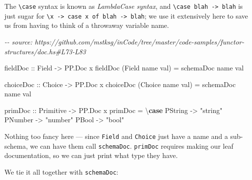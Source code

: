 \documentclass[]{article}
\newenvironment{Shaded}{}{}
\newcommand{\CommentTok}[1]{\textcolor[rgb]{0.38,0.63,0.69}{\textit{#1}}}
\newcommand{\DataTypeTok}[1]{\textcolor[rgb]{0.56,0.13,0.00}{#1}}
\newcommand{\KeywordTok}[1]{\textcolor[rgb]{0.00,0.44,0.13}{\textbf{#1}}}
\newcommand{\NormalTok}[1]{#1}
\newcommand{\OtherTok}[1]{\textcolor[rgb]{0.00,0.44,0.13}{#1}}
\newcommand{\StringTok}[1]{\textcolor[rgb]{0.25,0.44,0.63}{#1}}
\begin{document}
The \texttt{\textbackslash{}case} syntax is known as \emph{LambdaCase syntax},
and \texttt{\textbackslash{}case\ blah\ -\textgreater{}\ blah} is just sugar for
\texttt{\textbackslash{}x\ -\textgreater{}\ case\ x\ of\ blah\ -\textgreater{}\ blah};
we use it extensively here to save us from having to think of a throwaway
variable name.

\begin{Shaded}
\begin{Highlighting}[]
\CommentTok{{-}{-} source: https://github.com/mstksg/inCode/tree/master/code{-}samples/functor{-}structures/doc.hs\#L73{-}L83}

\OtherTok{fieldDoc ::} \DataTypeTok{Field} \OtherTok{{-}>} \DataTypeTok{PP.Doc}\NormalTok{ x}
\NormalTok{fieldDoc (}\DataTypeTok{Field}\NormalTok{ name val) }\OtherTok{=}\NormalTok{ schemaDoc name val}

\OtherTok{choiceDoc ::} \DataTypeTok{Choice} \OtherTok{{-}>} \DataTypeTok{PP.Doc}\NormalTok{ x}
\NormalTok{choiceDoc (}\DataTypeTok{Choice}\NormalTok{ name val) }\OtherTok{=}\NormalTok{ schemaDoc name val}

\OtherTok{primDoc ::} \DataTypeTok{Primitive} \OtherTok{{-}>} \DataTypeTok{PP.Doc}\NormalTok{ x}
\NormalTok{primDoc }\OtherTok{=}\NormalTok{ \textbackslash{}}\KeywordTok{case}
  \DataTypeTok{PString} \OtherTok{{-}>} \StringTok{"string"}
  \DataTypeTok{PNumber} \OtherTok{{-}>} \StringTok{"number"}
  \DataTypeTok{PBool}   \OtherTok{{-}>} \StringTok{"bool"}
\end{Highlighting}
\end{Shaded}

Nothing too fancy here --- since \texttt{Field} and \texttt{Choice} just have a
name and a sub-schema, we can have them call \texttt{schemaDoc}.
\texttt{primDoc} requires making our leaf documentation, so we can just print
what type they have.

We tie it all together with \texttt{schemaDoc}:
\end{document}

